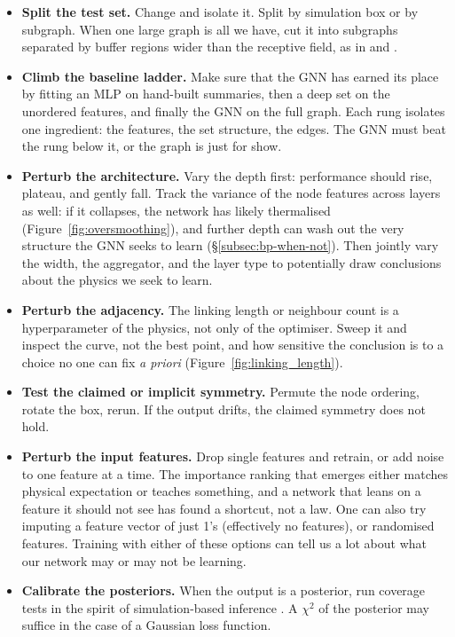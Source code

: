 \documentclass[graybox, envcountchap]{Template/svmult}
\begin{document}
\begin{itemize}
    \item \textbf{Split the test set.} Change and isolate it. Split by simulation box or by subgraph. When one large graph is all we have, cut it into subgraphs separated by buffer regions wider than the receptive field, as in \citet{Wu2023_galaxyenvironment_GNN} and \citet{Wu2024_galaxyhalo_environment}.
    \item \textbf{Climb the baseline ladder.} Make sure that the GNN has earned its place by fitting an MLP on hand-built summaries, then a deep set on the unordered features, and finally the GNN on the full graph. Each rung isolates one ingredient: the features, the set structure, the edges. The GNN must beat the rung below it, or the graph is just for show.
    \item \textbf{Perturb the architecture.} Vary the depth first: performance should rise, plateau, and gently fall. Track the variance of the node features across layers as well: if it collapses, the network has likely thermalised (Figure~\ref{fig:oversmoothing}), and further depth can wash out the very structure the GNN seeks to learn (\S\ref{subsec:bp-when-not}). Then jointly vary the width, the aggregator, and the layer type to potentially draw conclusions about the physics we seek to learn.
    \item \textbf{Perturb the adjacency.} The linking length or neighbour count is a hyperparameter of the physics, not only of the optimiser. Sweep it and inspect the curve, not the best point, and how sensitive the conclusion is to a choice no one can fix \textit{a priori} (Figure~\ref{fig:linking_length}).
    \item \textbf{Test the claimed or implicit symmetry.} Permute the node ordering, rotate the box, rerun. If the output drifts, the claimed symmetry does not hold.
    \item \textbf{Perturb the input features.} Drop single features and retrain, or add noise to one feature at a time. The importance ranking that emerges either matches physical expectation or teaches something, and a network that leans on a feature it should not see has found a shortcut, not a law. One can also try imputing a feature vector of just 1's (effectively no features), or randomised features. Training with either of these options can tell us a lot about what our network may or may not be learning.
    \item \textbf{Calibrate the posteriors.} When the output is a posterior, run coverage tests in the spirit of simulation-based inference \citep{Thiele2026_SBI_review}. A $\chi^2$ of the posterior may suffice in the case of a Gaussian loss function.
\end{itemize}
\end{document}

